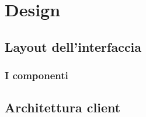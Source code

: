 \chapter{Design}


%

\section{Layout dell'interfaccia}
\subsection{I componenti}
\section{Architettura client}